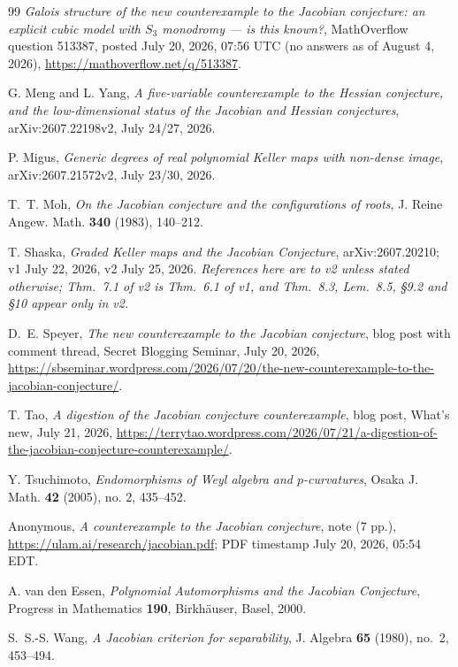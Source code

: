 \documentclass[11pt]{amsart}
\theoremstyle{plain}
\theoremstyle{definition}
\theoremstyle{remark}
\begin{document}
\begin{thebibliography}{99}
\emph{Galois structure of the new counterexample to the Jacobian
conjecture: an explicit cubic model with $S_{3}$ monodromy --- is this
known?},
MathOverflow question 513387, posted July 20, 2026, 07:56 UTC
(no answers as of August 4, 2026),
\url{https://mathoverflow.net/q/513387}.

G. Meng and L. Yang,
\emph{A five-variable counterexample to the Hessian conjecture, and the
low-dimensional status of the Jacobian and Hessian conjectures},
arXiv:2607.22198v2, July 24/27, 2026.

P. Migus,
\emph{Generic degrees of real polynomial Keller maps with non-dense
image},
arXiv:2607.21572v2, July 23/30, 2026.

T.~T. Moh,
\emph{On the Jacobian conjecture and the configurations of roots},
J. Reine Angew. Math. \textbf{340} (1983), 140--212.

T. Shaska,
\emph{Graded Keller maps and the Jacobian Conjecture},
arXiv:2607.20210; v1 July 22, 2026, v2 July 25, 2026. \emph{References
here are to v2 unless stated otherwise; Thm.~7.1 of v2 is Thm.~6.1 of v1,
and Thm.~8.3, Lem.~8.5, \S9.2 and \S10 appear only in v2.}

D.~E. Speyer,
\emph{The new counterexample to the Jacobian conjecture},
blog post with comment thread, Secret Blogging Seminar, July 20, 2026,
\url{https://sbseminar.wordpress.com/2026/07/20/the-new-counterexample-to-the-jacobian-conjecture/}.

T. Tao,
\emph{A digestion of the Jacobian conjecture counterexample},
blog post, What's new, July 21, 2026,
\url{https://terrytao.wordpress.com/2026/07/21/a-digestion-of-the-jacobian-conjecture-counterexample/}.

Y. Tsuchimoto,
\emph{Endomorphisms of Weyl algebra and $p$-curvatures},
Osaka J. Math. \textbf{42} (2005), no. 2, 435--452.

Anonymous,
\emph{A counterexample to the Jacobian conjecture},
note (7 pp.), \url{https://ulam.ai/research/jacobian.pdf}; PDF timestamp
July 20, 2026, 05:54 EDT.

A. van den Essen,
\emph{Polynomial Automorphisms and the Jacobian Conjecture},
Progress in Mathematics \textbf{190}, Birkh\"auser, Basel, 2000.

S.~S.-S. Wang,
\emph{A Jacobian criterion for separability},
J. Algebra \textbf{65} (1980), no.~2, 453--494.


\end{thebibliography}
\end{document}
